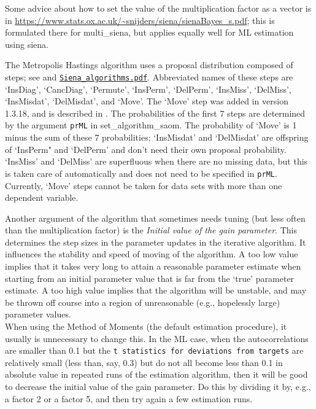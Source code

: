 \documentclass[a4paper,fleqn,11pt]{article}
\newcommand{\+}{\, + \,}
\begin{document}
Some advice about how to set the value of the multiplication factor
as a vector is in
\url{https://www.stats.ox.ac.uk/~snijders/siena/sienaBayes_s.pdf};
this is formulated there for \textsf{multi\_siena}, but applies
equally well for ML estimation using \textsf{siena}.
\medskip

The Metropolis Hastings algorithm uses a proposal distribution
composed of steps; see \citet{SnijdersEA10a} and
\href{http://www.stats.ox.ac.uk/~snijders/siena/Siena_algorithms.pdf}{\texttt{Siena\_algorithms.pdf}}.
Abbreviated names of these steps are `InsDiag', `CancDiag', `Permute', `InsPerm',
`DelPerm', `InsMiss', `DelMiss', `InsMisdat', `DelMisdat', and `Move'.
The `Move' step was added in version 1.3.18, and is described in
\citet{Greenan2015}.
The probabilities of the first 7 steps are determined by the argument \texttt{prML}
in  \textsf{set\_algorithm\_saom}. The probability of  `Move' is 1 minus the sum
of these 7 probabilities; `InsMisdat' and `DelMisdat' are offspring of `InsPerm" and
`DelPerm' and don't need their own proposal probability.
 `InsMiss' and  `DelMiss' are superfluous when there are no missing data,
but this is taken care of automatically and does not need to be specified in \texttt{prML}.
Currently, `Move' steps cannot be taken for data sets with
more than one dependent variable.
\medskip

Another argument of the algorithm that sometimes needs tuning
(but less often than the multiplication factor)
is the \emph{Initial value of the gain parameter}.
This determines the step sizes in the parameter updates in the iterative
algorithm.
It influences the stability and speed of moving of the algorithm.
A too low value implies that it takes very long to attain a
reasonable parameter estimate when starting from an initial
parameter value that is far from the `true' parameter estimate.
A too high value implies that the algorithm will be unstable,
and may be thrown off course into a region of unreasonable
(e.g., hopelessly large) parameter values.\\
When using the Method of Moments
(the default estimation procedure), it usually is unnecessary to change
this. In the ML case, when the autocorrelations are smaller
than 0.1 but the \texttt{t statistics for deviations from targets}
are relatively small (less than, say, 0.3) but do not all become
less than 0.1 in absolute value in repeated runs of the
estimation algorithm, then it will be good to decrease the
\textsf{initial value of the gain parameter}. Do this by dividing
it by, e.g., a factor 2 or a factor 5, and then try again
a few estimation runs.
\end{document}
